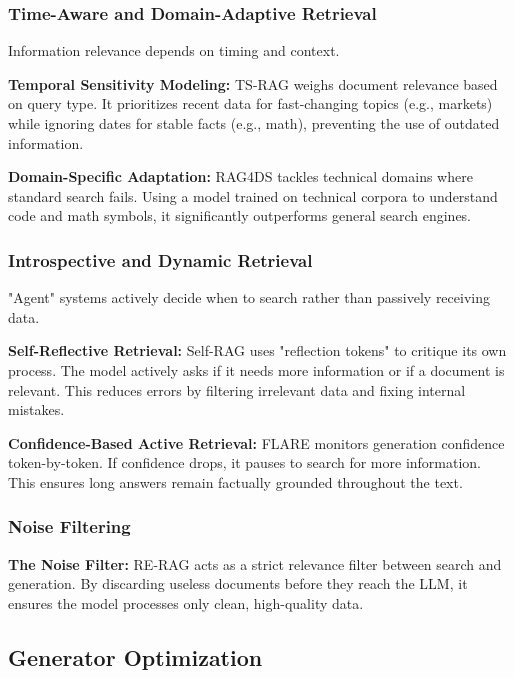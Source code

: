 \documentclass[11pt]{article}
\begin{document}
\subsubsection{Time-Aware and Domain-Adaptive Retrieval}

Information relevance depends on timing and context.

\textbf{Temporal Sensitivity Modeling:} TS-RAG \citep{ning2025ts} weighs document relevance based on query type. It prioritizes recent data for fast-changing topics (e.g., markets) while ignoring dates for stable facts (e.g., math), preventing the use of outdated information.

\textbf{Domain-Specific Adaptation:} RAG4DS \citep{alqatf2025rag4ds} tackles technical domains where standard search fails. Using a model trained on technical corpora to understand code and math symbols, it significantly outperforms general search engines.

\subsubsection{Introspective and Dynamic Retrieval}

"Agent" systems actively decide when to search rather than passively receiving data.

\textbf{Self-Reflective Retrieval:} Self-RAG \citep{asai2024selfrag} uses "reflection tokens" to critique its own process. The model actively asks if it needs more information or if a document is relevant. This reduces errors by filtering irrelevant data and fixing internal mistakes.

\textbf{Confidence-Based Active Retrieval:} FLARE \citep{jiang2023flare} monitors generation confidence token-by-token. If confidence drops, it pauses to search for more information. This ensures long answers remain factually grounded throughout the text.

\subsubsection{Noise Filtering}

\textbf{The Noise Filter:} RE-RAG \citep{kim2024reragimprovingopendomainqa} acts as a strict relevance filter between search and generation. By discarding useless documents before they reach the LLM, it ensures the model processes only clean, high-quality data.

\subsection{Generator Optimization}
\end{document}

